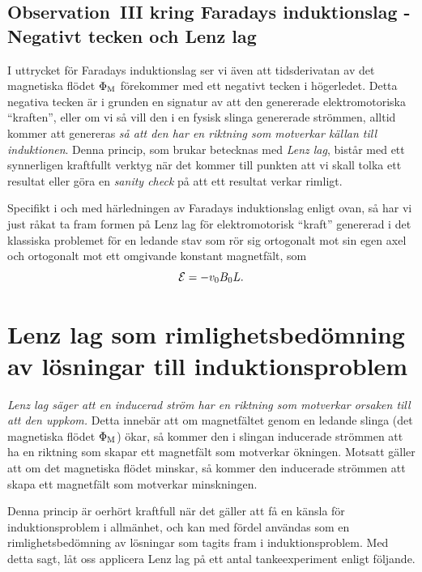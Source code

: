 \subsection{Observation~III kring Faradays induktionslag
  - Negativt tecken och Lenz lag}
I uttrycket f{\"o}r Faradays induktionslag ser vi {\"a}ven att tidsderivatan av
det magnetiska fl{\"o}det $\Phi_{\rm M}$ f{\"o}rekommer med ett negativt tecken i
h{\"o}gerledet. Detta negativa tecken {\"a}r i grunden en signatur av att den
genererade elektromotoriska ``kraften'', eller om vi s{\aa} vill den i en fysisk
slinga genererade str{\"o}mmen, alltid kommer att genereras {\it s{\aa} att den
har en riktning som motverkar k{\"a}llan till induktionen}.
Denna princip, som brukar betecknas med {\it Lenz lag}, bist{\aa}r med ett
synnerligen kraftfullt verktyg n{\"a}r det kommer till punkten att vi skall
tolka ett resultat eller g{\"o}ra en {\it sanity check} p{\aa} att ett resultat
verkar rimligt.

Specifikt i och med h{\"a}rledningen av Faradays induktionslag enligt ovan,
s{\aa} har vi just r{\aa}kat ta fram formen p{\aa} Lenz lag f{\"o}r
elektromotorisk ``kraft'' genererad i det klassiska problemet f{\"o}r en
ledande stav som r{\"o}r sig ortogonalt mot sin egen axel och ortogonalt mot
ett omgivande konstant magnetf{\"a}lt, som
$$
  {\cal E}=-v_0 B_0 L.
$$
\vfill\eject

\section{Lenz lag som rimlighetsbed{\"o}mning av l{\"o}sningar till
  induktionsproblem}
{\it Lenz lag s{\"a}ger att en inducerad str{\"o}m har en riktning som
motverkar orsaken till att den uppkom.} Detta inneb{\"a}r att om
magnetf{\"a}ltet genom en ledande slinga (det magnetiska fl{\"o}det
$\Phi_{\rm M}$) {\"o}kar, s{\aa} kommer den i slingan inducerade str{\"o}mmen
att ha en riktning som skapar ett magnetf{\"a}lt som motverkar {\"o}kningen.
Motsatt g{\"a}ller att om det magnetiska fl{\"o}det minskar, s{\aa} kommer den
inducerade str{\"o}mmen att skapa ett magnetf{\"a}lt som motverkar minskningen.

Denna princip {\"a}r oerh{\"o}rt kraftfull n{\"a}r det g{\"a}ller att f{\aa}
en k{\"a}nsla f{\"o}r induktionsproblem i allm{\"a}nhet, och kan med f{\"o}rdel
anv{\"a}ndas som en rimlighetsbed{\"o}mning av l{\"o}sningar som tagits fram i
induktionsproblem. Med detta sagt, l{\aa}t oss applicera Lenz lag p{\aa} ett
antal tankeexperiment enligt f{\"o}ljande.
\noindent
\vfill\eject

